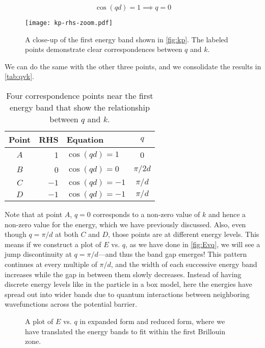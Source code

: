 \begin{equation*}
	\cos(qd) = 1 \implies q = 0
\end{equation*}

\begin{figure}[!h]
	\centering 
	\texttt{[image: kp-rhs-zoom.pdf]}
	\caption{A close-up of the first energy band shown in \autoref{fig:kp}. 
	The labeled points demonstrate clear correspondences between $q$ and $k$.}
	\label{fig:kp-zoom}
\end{figure}

We can do the same with the other three points, and we consolidate the results in \autoref{tab:qvk}.

\begin{table}[!h]
	\centering
	\begin{tabular}{crlc}
		Point & RHS & Equation & $q$ \\ \toprule
		$A$ & 1 & $\cos(qd) = 1$ & 0 \\
		$B$ & 0 & $\cos(qd) = 0$ & $\pi/2d$ \\
		$C$ & $-1$ & $\cos(qd) = -1$ & $\pi/d$ \\
		$D$ & $-1$ & $\cos(qd) = -1$ & $\pi/d$
	\end{tabular}
	\caption{Four correspondence points near the first energy band that show the relationship between $q$ and $k$.}
	\label{tab:qvk}
\end{table}

Note that at point $A$, $q = 0$ corresponds to a non-zero value of $k$ and hence a non-zero value for the energy, which we have previously discussed. 
Also, even though $q = \pi/d$ at both $C$ and $D$, those points are at different energy levels. 
This means if we construct a plot of $E$ vs. $q$, as we have done in \autoref{fig:Evq}, we will see a jump discontinuity at $q = \pi/d$---and thus the band gap emerges! 
This pattern continues at every multiple of $\pi/d$, and the width of each successive energy band increases while the gap in between them slowly decreases. 
Instead of having discrete energy levels like in the particle in a box model, here the energies have spread out into wider bands due to quantum interactions between neighboring wavefunctions across the potential barrier.

\begin{figure}[!h]
	\centering
	\hfill
	\caption{A plot of $E$ vs. $q$ in \protect{} expanded form and 
	\protect{} reduced form, where we have translated the energy bands to fit within the first Brillouin zone.}
	\label{fig:Evq}
\end{figure}


